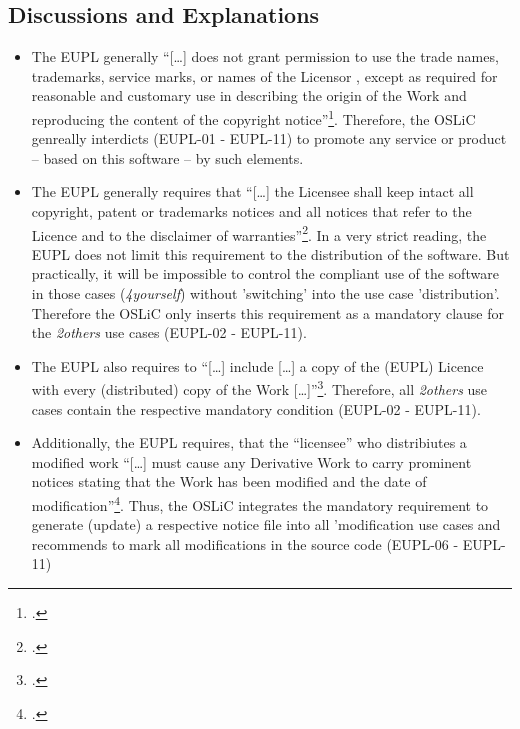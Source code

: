 \subsection{Discussions and Explanations}
\begin{itemize}
  
  \item The EUPL generally \enquote{[\ldots] does not grant permission to use
  the trade names, trademarks, service marks, or names of the Licensor , except
  as required for reasonable and customary use in describing the origin of the
  Work and reproducing the content of the copyright
  notice}\footcite[cf.][\nopage wp.\ §5]{EuplLicense2007en}. Therefore, the OSLiC
  genreally interdicts (EUPL-01 - EUPL-11) to promote any service or product --
  based on this software -- by such elements.

  \item The EUPL generally requires that \enquote{[\ldots] the Licensee shall
  keep intact all copyright, patent or trademarks notices and all notices that
  refer to the Licence and to the disclaimer of
  warranties}\footcite[cf.][\nopage wp.\ §5]{EuplLicense2007en}. In a very strict
  reading, the EUPL does not limit this requirement to the distribution of the
  software. But practically, it will be impossible to control the compliant use
  of the software in those cases (\emph{4yourself}) without 'switching' into the
  use case 'distribution'. Therefore the OSLiC only inserts this requirement as
  a mandatory clause for the \emph{2others} use cases (EUPL-02 - EUPL-11).
  
  \item The EUPL also requires to \enquote{[\ldots] include [\ldots] a copy of
  the (EUPL) Licence with every (distributed) copy of the Work
  [\ldots]}\footcite[cf.][\nopage wp.\ §5]{EuplLicense2007en}. Therefore, all
  \emph{2others} use cases contain the respective mandatory condition (EUPL-02 -
  EUPL-11).
  
  \item Additionally, the EUPL requires, that the \enquote{licensee} who
  distribiutes a modified work \enquote{[\ldots] must cause any Derivative Work
  to carry prominent notices stating that the Work has been modified and the
  date of modification}\footcite[cf.][\nopage wp.\ §5]{EuplLicense2007en}. Thus,
  the OSLiC integrates the mandatory requirement to generate (update) a
  respective notice file into all 'modification use cases and recommends to mark
  all modifications in the source code (EUPL-06 - EUPL-11)
  

\end{itemize}
